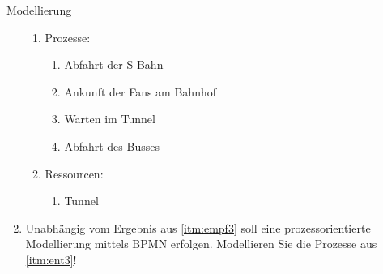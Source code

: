 \documentclass{article}
\begin{document}
\begin{exercise}{Modellierung}
\begin{enumerate}
\begin{solution}
\begin{enumerate}
              \item Prozesse:
                    \begin{enumerate}
                      \item Abfahrt der S-Bahn
                      \item Ankunft der Fans am Bahnhof
                      \item Warten im Tunnel
                      \item Abfahrt des Busses
                    \end{enumerate}
              \item Ressourcen:
                    \begin{enumerate}
                      \item Tunnel
                    \end{enumerate}
            \end{enumerate}
          \end{solution}
    \item Unabhängig vom Ergebnis aus \ref{itm:empf3} soll eine prozessorientierte Modellierung mittels BPMN erfolgen. Modellieren Sie die Prozesse aus \ref{itm:ent3}!
          \begin{solution}
          \end{solution}
  \end{enumerate}
\end{exercise}
\end{document}
